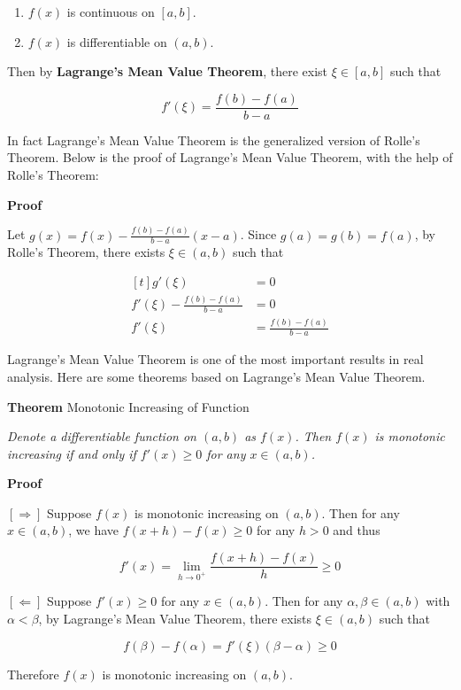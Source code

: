 \documentclass[a4paper,12pt]{article}
\newcommand{\s}{\vspace{1mm}}
\newcommand{\n}{\vspace{3mm}}
\newenvironment{block}[4][Block]{ %
\begin{list}{}{
  \setlength{\leftmargin}{0mm}
  \setlength{\rightmargin}{0mm}
  \setlength{\topsep}{0mm}
  \setlength{\partopsep}{0mm}
  \parsep\parskip
  \setlength{\itemsep}{-\parsep}
  }
  \needspace{\baselineskip}
  \item \textbf{#2 #3} \hspace{1mm} #4
  \vspace{1mm}
  \item
  }
{
\end{list}
}
\newenvironment{alist}{ %
\begin{enumerate}[label=(\alph*)]
}{
\end{enumerate}
}
\begin{document}
\begin{alist}
  \item $f(x)$ is continuous on $[a,b]$.
  \item $f(x)$ is differentiable on $(a,b)$.
\end{alist}

Then by \textbf{Lagrange's Mean Value Theorem}, there exist $\xi\in [a,b]$ such that

$$f'(\xi)=\frac{f(b)-f(a)}{b-a}$$\s

In fact Lagrange's Mean Value Theorem is the generalized version of Rolle's Theorem. Below is the proof of Lagrange's Mean Value Theorem, with the help of Rolle's Theorem:\n

\begin{block}{Proof}{}{}
  Let $g(x)=f(x)-\frac{f(b)-f(a)}{b-a}(x-a)$. Since $g(a)=g(b)=f(a)$, by Rolle's Theorem, there exists $\xi\in (a,b)$ such that

  $$\begin{aligned}[t]
    g'(\xi)&=0\\
    f'(\xi)-\frac{f(b)-f(a)}{b-a}&=0\\
    f'(\xi)&=\frac{f(b)-f(a)}{b-a}
  \end{aligned}$$\s
\end{block}\n

Lagrange's Mean Value Theorem is one of the most important results in real analysis. Here are some theorems based on Lagrange's Mean Value Theorem.\n

\begin{block}{Theorem}{}{Monotonic Increasing of Function}
  \textit{Denote a differentiable function on $(a,b)$ as $f(x)$. Then $f(x)$ is monotonic increasing if and only if $f'(x)\geq 0$ for any $x\in (a,b)$.}
\end{block}\n

\begin{block}{Proof}{}{}
  $[\Rightarrow]$ Suppose $f(x)$ is monotonic increasing on $(a,b)$. Then for any $x\in (a,b)$, we have $f(x+h)-f(x)\geq 0$ for any $h>0$ and thus

  $$f'(x)=\lim_{h\to 0^{+}}\frac{f(x+h)-f(x)}{h}\geq 0$$\s

  $[\Leftarrow]$ Suppose $f'(x)\geq 0$ for any $x\in (a,b)$. Then for any $\alpha ,\beta\in (a,b)$ with $\alpha<\beta$, by Lagrange's Mean Value Theorem, there exists $\xi\in (a,b)$ such that

  $$f(\beta)-f(\alpha)=f'(\xi)(\beta-\alpha)\geq 0$$\s

  Therefore $f(x)$ is monotonic increasing on $(a,b)$.
\end{block}\n
\end{document}
